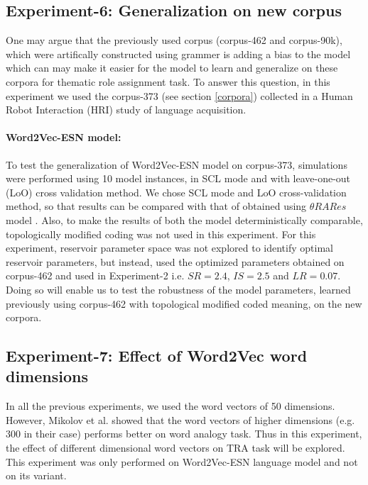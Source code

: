 \subsection{Experiment-6: Generalization on new corpus} \label{exp-6}

One may argue that the previously used corpus (corpus-462 and corpus-90k), which were artifically constructed using grammer is adding a bias to the model which can may make it easier for the model to learn and generalize on these corpora for thematic role assignment task. To answer this question, in this experiment we used the corpus-373 (see section \ref{corpora}) collected in a Human Robot Interaction (HRI) study of language acquisition. 

\paragraph{Word2Vec-ESN model:} To test the generalization of Word2Vec-ESN model on corpus-373, simulations were performed using 10 model instances, in SCL mode and with leave-one-out (LoO) cross validation method. We chose SCL mode and LoO cross-validation method, so that results can be compared with that of obtained using $\theta RARes$ model \cite{tra:xavier_hri}. Also, to make the results of both the model deterministically comparable, topologically modified coding was not used in this experiment. For this experiment, reservoir parameter space was not explored to identify optimal reservoir parameters, but instead, used the optimized parameters obtained on corpus-462 and used in Experiment-2 i.e. $SR = 2.4$, $IS = 2.5$ and $LR = 0.07$. Doing so will enable us to test the robustness of the model parameters, learned previously using corpus-462 with topological modified coded meaning, on the new corpora.

\subsection{Experiment-7: Effect of Word2Vec word dimensions} \label{exp-6}

In all the previous experiments, we used the word vectors of 50 dimensions. However, Mikolov et al. \cite{w2v:mikolov_2013_efficient, w2v:mikolov_2013_distributed} showed that the word vectors of higher dimensions (e.g. 300 in their case) performs better on word analogy task. Thus in this experiment, the effect of different dimensional word vectors on TRA task will be explored. This experiment was only performed on Word2Vec-ESN language model and not on its variant.

